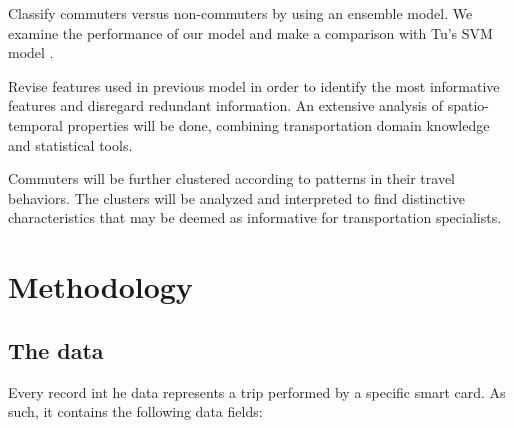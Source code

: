 \documentclass{article}
\begin{document}
\begin{description}[align=right,labelwidth=2cm]
\item[PART I] Classify commuters versus non-commuters by using an ensemble model. We examine the performance of our model and make a comparison with Tu's SVM model \cite{tu2016impact}.

\item[PART II] Revise features used in previous model in order to identify the most informative features and disregard redundant information. An extensive analysis of spatio-temporal properties will be done, combining transportation domain knowledge and statistical tools.

\item[PART III] Commuters will be further clustered according to patterns in their travel behaviors. The clusters will be analyzed and interpreted to find distinctive characteristics that may be deemed as informative for transportation specialists. 
\end{description}


\newpage
\section{Methodology}
\subsection{The data}
\label{sec:data}
Every record int he data represents a trip performed by a specific smart card. As such, it contains the following data fields:
\end{document}
